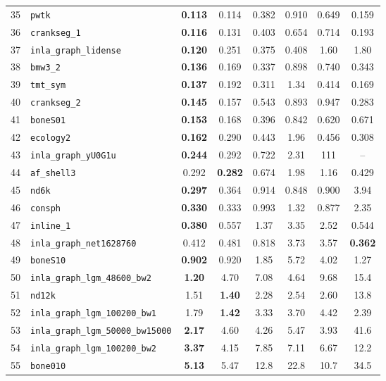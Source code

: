 \begin{footnotesize}
\begin{longtable}{rl cccccc}
35 & \texttt{pwtk} & \textbf{0.113} & 0.114 & 0.382 & 0.910 & 0.649 & 0.159 \\
36 & \texttt{crankseg\_1} & \textbf{0.116} & 0.131 & 0.403 & 0.654 & 0.714 & 0.193 \\
37 & \texttt{inla\_graph\_lidense} & \textbf{0.120} & 0.251 & 0.375 & 0.408 & 1.60 & 1.80 \\
38 & \texttt{bmw3\_2} & \textbf{0.136} & 0.169 & 0.337 & 0.898 & 0.740 & 0.343 \\
39 & \texttt{tmt\_sym} & \textbf{0.137} & 0.192 & 0.311 & 1.34 & 0.414 & 0.169 \\
40 & \texttt{crankseg\_2} & \textbf{0.145} & 0.157 & 0.543 & 0.893 & 0.947 & 0.283 \\
41 & \texttt{boneS01} & \textbf{0.153} & 0.168 & 0.396 & 0.842 & 0.620 & 0.671 \\
42 & \texttt{ecology2} & \textbf{0.162} & 0.290 & 0.443 & 1.96 & 0.456 & 0.308 \\
43 & \texttt{inla\_graph\_yU0G1u} & \textbf{0.244} & 0.292 & 0.722 & 2.31 & 111 & -- \\
44 & \texttt{af\_shell3} & 0.292 & \textbf{0.282} & 0.674 & 1.98 & 1.16 & 0.429 \\
45 & \texttt{nd6k} & \textbf{0.297} & 0.364 & 0.914 & 0.848 & 0.900 & 3.94 \\
46 & \texttt{consph} & \textbf{0.330} & 0.333 & 0.993 & 1.32 & 0.877 & 2.35 \\
47 & \texttt{inline\_1} & \textbf{0.380} & 0.557 & 1.37 & 3.35 & 2.52 & 0.544 \\
48 & \texttt{inla\_graph\_net1628760} & 0.412 & 0.481 & 0.818 & 3.73 & 3.57 & \textbf{0.362} \\
49 & \texttt{boneS10} & \textbf{0.902} & 0.920 & 1.85 & 5.72 & 4.02 & 1.27 \\
50 & \texttt{inla\_graph\_lgm\_48600\_bw2} & \textbf{1.20} & 4.70 & 7.08 & 4.64 & 9.68 & 15.4 \\
51 & \texttt{nd12k} & 1.51 & \textbf{1.40} & 2.28 & 2.54 & 2.60 & 13.8 \\
52 & \texttt{inla\_graph\_lgm\_100200\_bw1} & 1.79 & \textbf{1.42} & 3.33 & 3.70 & 4.42 & 2.39 \\
53 & \texttt{inla\_graph\_lgm\_50000\_bw15000} & \textbf{2.17} & 4.60 & 4.26 & 5.47 & 3.93 & 41.6 \\
54 & \texttt{inla\_graph\_lgm\_100200\_bw2} & \textbf{3.37} & 4.15 & 7.85 & 7.11 & 6.67 & 12.2 \\
55 & \texttt{bone010} & \textbf{5.13} & 5.47 & 12.8 & 22.8 & 10.7 & 34.5 \\

\end{longtable}
\end{footnotesize}
